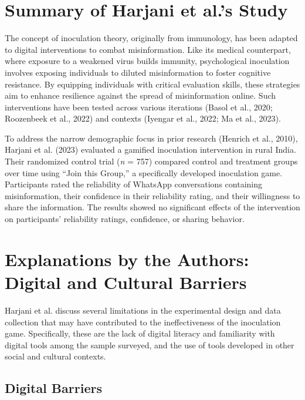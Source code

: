 \documentclass[authordate, reflection]{jote-new-article}
\begin{document}
	\section{Summary of Harjani et al.'s Study}



	The concept of inoculation theory, originally from immunology, has been adapted to digital interventions to combat misinformation. Like its medical counterpart, where exposure to a weakened virus builds immunity, psychological inoculation involves exposing individuals to diluted misinformation to foster cognitive resistance. By equipping individuals with critical evaluation skills, these strategies aim to enhance resilience against the spread of misinformation online. Such interventions have been tested across various iterations (Basol et al., 2020; Roozenbeek et al., 2022) and contexts (Iyengar et al., 2022; Ma et al., 2023).



	To address the narrow demographic focus in prior research (Henrich et al., 2010), Harjani et al. (2023) evaluated a gamified inoculation intervention in rural India. Their randomized control trial (\emph{n} = 757) compared control and treatment groups over time using “Join this Group,” a specifically developed inoculation game. Participants rated the reliability of WhatsApp conversations containing misinformation, their confidence in their reliability rating, and their willingness to share the information. The results showed no significant effects of the intervention on participants' reliability ratings, confidence, or sharing behavior.



	\section{Explanations by the Authors: Digital and Cultural Barriers}



	Harjani et al. discuss several limitations in the experimental design and data collection that may have contributed to the ineffectiveness of the inoculation game. Specifically, these are the lack of digital literacy and familiarity with digital tools among the sample surveyed, and the use of tools developed in other social and cultural contexts.



	\subsection{Digital Barriers}
\end{document}
